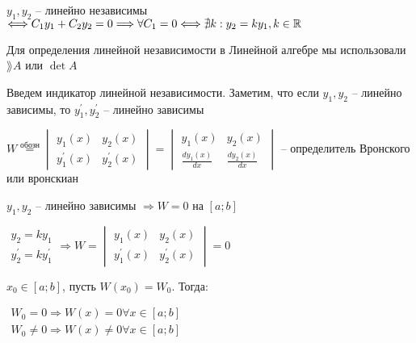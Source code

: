 \documentclass[12pt]{article}
\begin{document}
    \Def $y_1, y_2$ -- линейно независимы $\Longleftrightarrow C_1 y_1 + C_2 y_2 = 0 \Longrightarrow \forall C_1 = 0 \Longleftrightarrow \nexists k : y_2 = k y_1, k \in \mathbb{R}$

    \Mem Для определения линейной независимости в Линейной алгебре мы использовали $\rang A$ или $\det A$

    Введем индикатор линейной независимости.
    Заметим, что если $y_1, y_2$ -- линейно зависимы, то $y_1^\prime, y_2^\prime$ -- линейно зависимы

    \Def $W \stackrel{\text{обозн}}{=} \begin{vmatrix}y_1(x) & y_2(x) \\ y_1^\prime(x) & y_2^\prime(x)\end{vmatrix} = \begin{vmatrix}y_1(x) & y_2(x) \\ \frac{d y_1(x)}{dx} & \frac{d y_2(x)}{dx}\end{vmatrix}$ -- определитель Вронского или вронскиан

    \begin{MyTheorem}
         $y_1, y_2$ -- линейно зависимы $\Longrightarrow W = 0$ на $[a;b]$
    \end{MyTheorem}

    \begin{MyProof}
        $\begin{matrix}y_2 = k y_1 \\ y_2^\prime = k y_1^\prime\end{matrix} \Longrightarrow W = \begin{vmatrix}y_1(x) & y_2(x) \\ y_1^\prime(x) & y_2^\prime(x)\end{vmatrix} = 0$
    \end{MyProof}

    \begin{MyTheorem}
         $x_0 \in [a;b]$, пусть $W(x_0) = W_0$. Тогда: 
        
        $\begin{matrix}W_0 = 0 \Longrightarrow W(x) = 0 \forall x \in [a;b] \\
        W_0 \neq 0 \Longrightarrow W(x) \neq 0 \forall x \in [a;b]\end{matrix}$
    \end{MyTheorem}
\end{document}
